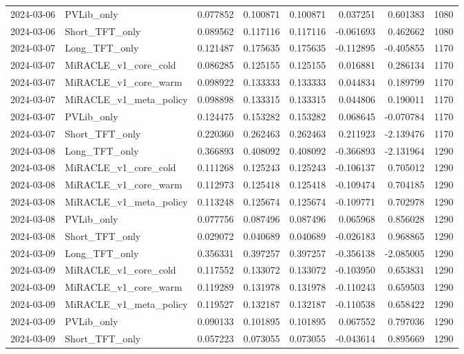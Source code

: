 \begin{tabular}{llrrrrrr}
2024-03-06 & PVLib_only & 0.077852 & 0.100871 & 0.100871 & 0.037251 & 0.601383 & 1080 \\
2024-03-06 & Short_TFT_only & 0.089562 & 0.117116 & 0.117116 & -0.061693 & 0.462662 & 1080 \\
2024-03-07 & Long_TFT_only & 0.121487 & 0.175635 & 0.175635 & -0.112895 & -0.405855 & 1170 \\
2024-03-07 & MiRACLE_v1_core_cold & 0.086285 & 0.125155 & 0.125155 & 0.016881 & 0.286134 & 1170 \\
2024-03-07 & MiRACLE_v1_core_warm & 0.098922 & 0.133333 & 0.133333 & 0.044834 & 0.189799 & 1170 \\
2024-03-07 & MiRACLE_v1_meta_policy & 0.098898 & 0.133315 & 0.133315 & 0.044806 & 0.190011 & 1170 \\
2024-03-07 & PVLib_only & 0.124475 & 0.153282 & 0.153282 & 0.068645 & -0.070784 & 1170 \\
2024-03-07 & Short_TFT_only & 0.220360 & 0.262463 & 0.262463 & 0.211923 & -2.139476 & 1170 \\
2024-03-08 & Long_TFT_only & 0.366893 & 0.408092 & 0.408092 & -0.366893 & -2.131964 & 1290 \\
2024-03-08 & MiRACLE_v1_core_cold & 0.111268 & 0.125243 & 0.125243 & -0.106137 & 0.705012 & 1290 \\
2024-03-08 & MiRACLE_v1_core_warm & 0.112973 & 0.125418 & 0.125418 & -0.109474 & 0.704185 & 1290 \\
2024-03-08 & MiRACLE_v1_meta_policy & 0.113248 & 0.125674 & 0.125674 & -0.109771 & 0.702978 & 1290 \\
2024-03-08 & PVLib_only & 0.077756 & 0.087496 & 0.087496 & 0.065968 & 0.856028 & 1290 \\
2024-03-08 & Short_TFT_only & 0.029072 & 0.040689 & 0.040689 & -0.026183 & 0.968865 & 1290 \\
2024-03-09 & Long_TFT_only & 0.356331 & 0.397257 & 0.397257 & -0.356138 & -2.085005 & 1290 \\
2024-03-09 & MiRACLE_v1_core_cold & 0.117552 & 0.133072 & 0.133072 & -0.103950 & 0.653831 & 1290 \\
2024-03-09 & MiRACLE_v1_core_warm & 0.119289 & 0.131978 & 0.131978 & -0.110243 & 0.659503 & 1290 \\
2024-03-09 & MiRACLE_v1_meta_policy & 0.119527 & 0.132187 & 0.132187 & -0.110538 & 0.658422 & 1290 \\
2024-03-09 & PVLib_only & 0.090133 & 0.101895 & 0.101895 & 0.067552 & 0.797036 & 1290 \\
2024-03-09 & Short_TFT_only & 0.057223 & 0.073055 & 0.073055 & -0.043614 & 0.895669 & 1290 \\

\end{tabular}

